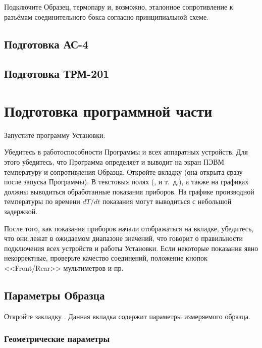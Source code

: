 \documentclass[12pt, a4paper, twocolumn]{report}
\begin{document}
Подключите Образец, термопару и, возможно, эталонное сопротивление к разъёмам соединительного бокса согласно принципиальной схеме.

\subsection{Подготовка АС-4}



\subsection{Подготовка ТРМ-201}



\section{Подготовка программной части}

Запустите программу Установки.

Убедитесь в работоспособности Программы и всех аппаратных устройств. Для этого убедитесь, что Программа определяет и выводит на экран ПЭВМ температуру и сопротивления Образца. Откройте вкладку  (она открыта сразу после запуска Программы). В текстовых полях (,  и т.~д.), а также на графиках должны выводиться обработанные показания приборов. На графике производной температуры по времени $dT/dt$ показания могут выводиться с небольшой задержкой.

После того, как показания приборов начали отображаться на вкладке, убедитесь, что они лежат в ожидаемом диапазоне значений, что говорит о правильности подключения всех устройств и работы Установки. Если некоторые показания явно некорректные, проверьте качество соединений, положение кнопок <<Front/Rear>> мультиметров и пр.

\subsection{Параметры Образца}

Откройте закладку . Данная вкладка содержит параметры измеряемого образца.

\subsubsection{Геометрические параметры}
\label{sec_geom_params}
\end{document}
